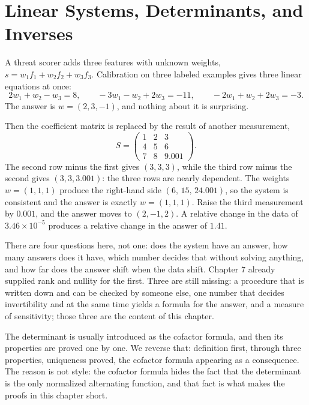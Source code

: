 \chapter{Linear Systems, Determinants, and Inverses}

A threat scorer adds three features with unknown weights,
$s=w_{1}f_{1}+w_{2}f_{2}+w_{3}f_{3}$. Calibration on three labeled examples gives three
linear equations at once:
\[
  2w_{1}+w_{2}-w_{3}=8,\qquad
  -3w_{1}-w_{2}+2w_{3}=-11,\qquad
  -2w_{1}+w_{2}+2w_{3}=-3 .
\]
The answer is $w=(2,3,-1)$, and nothing about it is surprising.

Then the coefficient matrix is replaced by the result of another measurement,
\[
  S=\begin{pmatrix}1&2&3\\ 4&5&6\\ 7&8&9.001\end{pmatrix}.
\]
The second row minus the first gives $(3,3,3)$, while the third row minus the second gives
$(3,3,3.001)$: the three rows are nearly dependent. The weights $w=(1,1,1)$ produce the
right-hand side $(6,\,15,\,24.001)$, so the system is consistent and the answer is exactly
$w=(1,1,1)$. Raise the third measurement by $0.001$, and the answer moves to
$(2,-1,2)$. A relative change in the data of $3.46\times10^{-5}$ produces a relative change
in the answer of $1.41$.

There are four questions here, not one: does the system have an answer, how many answers does
it have, which number decides that without solving anything, and how far does the answer shift
when the data shift. Chapter 7 already supplied rank and nullity for the first. Three are still
missing: a procedure that is written down and can be checked by someone else, one number that
decides invertibility and at the same time yields a formula for the answer, and a measure of
sensitivity; those three are the content of this chapter.

The determinant is usually introduced as the cofactor formula, and then its properties are
proved one by one. We reverse that: definition first, through three properties, uniqueness
proved, the cofactor formula appearing as a consequence. The reason is not style: the cofactor
formula hides the fact that the determinant is the only normalized alternating function, and
that fact is what makes the proofs in this chapter short.

